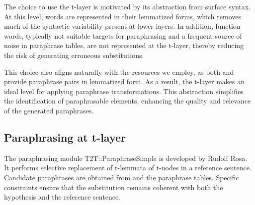 The choice to use the t-layer is motivated by its abstraction from surface syntax. At this level, words are represented in their lemmatized forms, which removes much of the syntactic variability present at lower layers. In addition, function words, typically not suitable targets for paraphrasing and a frequent source of noise in paraphrase tables, are not represented at the t-layer, thereby reducing the risk of generating erroneous substitutions.

This choice also aligns naturally with the resources we employ, as both \fm and \wordnet provide paraphrase pairs in lemmatized form. As a result, the t-layer makes an ideal level for applying paraphrase transformations. This abstraction simplifies the identification of paraphrasable elements, enhancing the quality and relevance of the generated paraphrases.



\subsection{Paraphrasing at t-layer}
\label{sect:treex:paraphrasing}

The paraphrasing module T2T::ParaphraseSimple is developed by Rudolf Rosa. It performs selective replacement of t-lemmata of t-nodes in a reference sentence.
Candidate paraphrases are obtained from \wordnet and the \fm paraphrase tables. Specific constraints ensure that the substitution remains coherent with both the hypothesis and the reference sentence.

